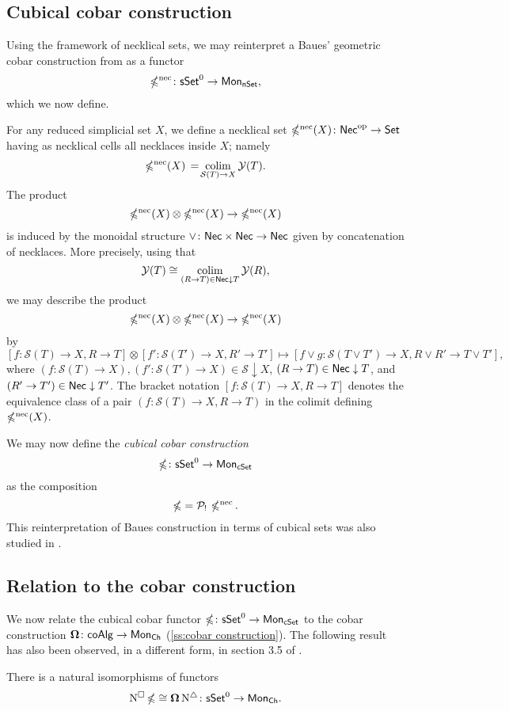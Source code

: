 \subsection{Cubical cobar construction} \label{ss:cubical cobar}

Using the framework of necklical sets, we may reinterpret a Baues' geometric cobar construction from \cite{baues1998hopf} as a functor
\[
\operatorname{\mathbb{\Omega}^{\mathrm{nec}}} \colon \mathsf{sSet}^0 \to \mathsf{Mon}_{\mathsf{nSet}},
\]
which we now define.

For any reduced simplicial set $X$, we define a necklical set $\operatorname{\mathbb{\Omega}^{\mathrm{nec}}}(X) \colon \mathsf{Nec}^{\mathrm{op}} \to \mathsf{Set}$ having as necklical cells all necklaces inside $X$; namely
\[
\operatorname{\mathbb{\Omega}^{\mathrm{nec}}}(X) \, = \! \operatorname*{colim}_{\mathcal{S}(T) \to X} \mathcal{Y}(T).
\]
The product
\[
\operatorname{\mathbb{\Omega}^{\mathrm{nec}}}(X) \otimes \operatorname{\mathbb{\Omega}^{\mathrm{nec}}}(X) \to \operatorname{\mathbb{\Omega}^{\mathrm{nec}}}(X)
\]
is induced by the monoidal structure $\vee \colon \mathsf{Nec} \times \mathsf{Nec} \to \mathsf{Nec}$ given by concatenation of necklaces.
More precisely, using that
\[
\mathcal{Y}(T) \cong \operatorname*{colim}_{(R \to T) \in \mathsf{Nec} \downarrow T} \mathcal{Y}(R),
\]
we may describe the product
\[
\operatorname{\mathbb{\Omega}^{\mathrm{nec}}}(X) \otimes \operatorname{\mathbb{\Omega}^{\mathrm{nec}}}(X) \to \operatorname{\mathbb{\Omega}^{\mathrm{nec}}}(X)
\]
by
\[
[f\colon \mathcal{S}(T) \to X, R \to T] \otimes [f'\colon \mathcal{S}(T') \to X, R' \to T'] \mapsto [f \vee g\colon \mathcal{S}(T\vee T') \to X, R \vee R'\to T \vee T'],
\]
where $(f\colon \mathcal{S}(T) \to X), (f'\colon \mathcal{S}(T') \to X) \in \mathcal{S} \downarrow X$, $ (R\to T) \in \mathsf{Nec} \downarrow T$, and $(R' \to T') \in \mathsf{Nec} \downarrow T'$.
The bracket notation $[f\colon \mathcal{S}(T) \to X, R\to T]$ denotes the equivalence class of a pair $(f \colon \mathcal{S}(T) \to X, R \to T)$ in the colimit defining $\operatorname{\mathbb{\Omega}^{\mathrm{nec}}}(X)$.

We may now define the \textit{cubical cobar construction}
\[
\operatorname{\mathbb{\Omega}} \colon \mathsf{sSet}^0 \to \mathsf{Mon}_{\mathsf{cSet}}
\]
as the composition
\[
\operatorname{\mathbb{\Omega}} = \mathcal{P}_! \, \operatorname{\mathbb{\Omega}^{\mathrm{nec}}}.
\]
This reinterpretation of Baues construction in terms of cubical sets was also studied in \cite{rivera2018cubical}.

\subsection{Relation to the cobar construction}

We now relate the cubical cobar functor $\operatorname{\mathbb{\Omega}} \colon \mathsf{sSet}^0 \to \mathsf{Mon}_{\mathsf{cSet}}$ to the cobar construction $\operatorname{\mathbf{\Omega}} \colon \mathsf{coAlg} \to \mathsf{Mon}_{\mathsf{Ch}}$ (\cref{ss:cobar construction}).
The following result has also been observed, in a different form, in section 3.5 of \cite{berger1995loops}.

\begin{lemma} \label{l:ccobar and cobar}
	There is a natural isomorphisms of functors
	\[
	\operatorname{N^{\square}} \operatorname{\mathbb{\Omega}} \cong \operatorname{\mathbf{\Omega}} \operatorname{N^{\triangle}} \colon \mathsf{sSet}^0 \to \mathsf{Mon}_{\mathsf{Ch}}.
	\]
\end{lemma}

